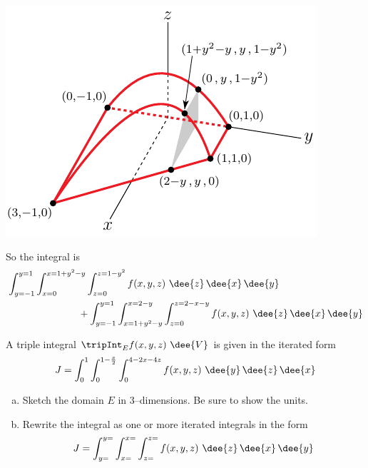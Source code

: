 \begin{solution}
\begin{center}
     \includegraphics{fig/OE05D_9d.pdf}
\end{center}

So the integral is
\begin{align*}
&\int_{y=-1}^{y=1} \int_{x=0}^{x=1+y^2-y} \int_{z=0}^{z=1-y^2} f(x,y,z)
                                    \ \dee{z}\,\dee{x}\,\dee{y} \\
&\hskip1in
+\int_{y=-1}^{y=1} \int_{x=1+y^2-y}^{x=2-y} \int_{z=0}^{z=2-x-y} f(x,y,z)
                                    \ \dee{z}\,\dee{x}\,\dee{y}
\end{align*}
\end{solution}


\begin{question}[M200 2006D] %
A triple integral $\tripInt_E f(x,y,z)\ \dee{V}$ is given in the 
iterated form
\begin{equation*}
J = \int_0^1 \int_0^{1-\frac{x}{2}} \int_0^{4-2x-4z} f(x,y,z)
                                    \ \dee{y}\,\dee{z}\,\dee{x}
\end{equation*}
\begin{enumerate}[(a)]
\item
Sketch the domain $E$ in 3--dimensions. Be sure to show the units.
\item
Rewrite the integral as one or more iterated integrals in the form
\begin{equation*}
J = \int_{y=}^{y=} \int_{x=}^{x=} \int_{z=}^{z=} f(x,y,z)
                                    \ \dee{z}\,\dee{x}\,\dee{y}
\end{equation*}
\end{enumerate}
\end{question}

